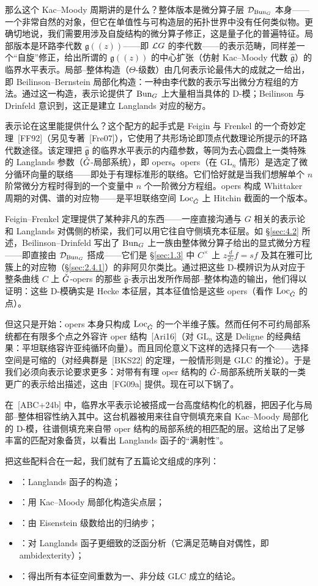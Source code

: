 那么这个 Kac–Moody 周期讲的是什么？整体版本是微分算子层 $\mathcal{D}_{\operatorname{Bun}_{G}}$ 本身——一个非常自然的对象，但它在单值性与可构造层的拓扑世界中没有任何类似物。更确切地说，我们需要用涉及自旋结构的微分算子修正，这是量子化的普遍特征。局部版本是环路李代数 $\mathfrak{g}((z))$——即 $\mathcal{L}G$ 的李代数——的表示范畴，同样差一个“自旋”修正，给出所谓的 $\mathfrak{g}((z))$ 的中心扩张（仿射 Kac–Moody 代数 $\widehat{\mathfrak{g}}$）的临界水平表示。局部–整体构造（$\Theta$-级数）由几何表示论最伟大的成就之一给出，即 Beilinson–Bernstein 局部化构造：一种由李代数的表示写出微分方程组的方法。通过这一构造，表示论提供了 $\operatorname{Bun}_{G}$ 上大量相当具体的 D-模；Beilinson 与 Drinfeld 意识到，这正是建立 Langlands 对应的秘方。

表示论在这里能提供什么？这个配方的起手式是 Feigin 与 Frenkel 的一个奇妙定理~[FF92]（另见专著~[Fre07]），它使用了共形场论即顶点代数理论所提示的环路代数途径。该定理把 $\widehat{\mathfrak{g}}$ 的临界水平表示的内蕴参数，等同为去心圆盘上一类特殊的 Langlands 参数（$\check{G}$-局部系统），即 opers。opers（在 $\mathrm{GL}_{n}$ 情形）是选定了微分循环向量的联络——即处于有理标准形的联络。它们恰好就是当我们想解单个 $n$ 阶常微分方程时得到的一个变量中 $n$ 个一阶微分方程组。opers 构成 Whittaker 周期的对偶、谱的对应物——是平坦联络空间 $\operatorname{Loc}_{\check{G}}$ 上 Hitchin 截面的一个版本。

Feigin–Frenkel 定理提供了某种非凡的东西——一座直接沟通与 $G$ 相关的表示论和 Langlands 对偶侧的桥梁，我们可以用它往自守侧填充本征层。如 \S\ref{sec:4.2} 所述，Beilinson–Drinfeld 写出了 $\operatorname{Bun}_{G}$ 上一族由整体微分算子给出的显式微分方程——即直接由 $\mathcal{D}_{\operatorname{Bun}_{G}}$ 搭成——它们是 \S\ref{sec:1.3} 中 $C^{\times}$ 上 $z\frac{d}{dz}f=sf$ 及其在雅可比簇上的对应物（\S\ref{sec:2.4.1}）的非阿贝尔类比。通过把这些 D-模辨识为从对应于整条曲线 $C$ 上 $\check{G}$-opers 的那些 $\widehat{\mathfrak{g}}$-表示出发所作局部–整体构造的输出，他们得以证明：这些 D-模确实是 Hecke 本征层，其本征值恰是这些 opers（看作 $\operatorname{Loc}_{\check{G}}$ 的点）。

但这只是开始：opers 本身只构成 $\operatorname{Loc}_{\check{G}}$ 的一个半维子簇。然而任何不可约局部系统都在有限多个点之外容许 oper 结构~[Ari16]（对 $\mathrm{GL}_{n}$ 这是 Deligne 的经典结果：平坦联络容许亚纯循环向量）。而且同伦意义下这样的选择只有一个——选择空间是可缩的（对经典群是~[BKS22] 的定理，一般情形则是 GLC 的推论）。于是我们必须向表示论要求更多：对带有有理 oper 结构的 $\check{G}$-局部系统所关联的一类更广的表示给出描述，这由~[FG09a] 提供。现在可以下锅了。

在~[ABC+24b] 中，临界水平表示论被搭成一台高度结构化的机器，把因子化与局部–整体相容性纳入其中。这台机器被用来往自守侧填充来自 Kac–Moody 局部化的 D-模，往谱侧填充来自带 oper 结构的局部系统的相匹配的层。这给出了足够丰富的匹配对象备货，以看出 Langlands 函子的“满射性”。

把这些配料合在一起，我们就有了五篇论文组成的序列：

\begin{itemize}
\item [GR24a]：Langlands 函子的构造；
\item [ABC+24b]：用 Kac–Moody 局部化构造尖点层；
\item [CCF+24]：由 Eisenstein 级数给出的归纳步；
\item [ABC+24a]：对 Langlands 函子更细致的泛函分析（它满足范畴自对偶性，即 ambidexterity）；
\item [GR24b]：得出所有本征空间重数为一、非分歧 GLC 成立的结论。
\end{itemize}

